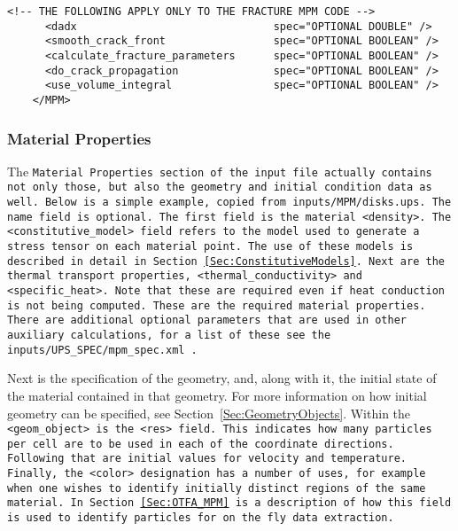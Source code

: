 \begin{Verbatim}[fontsize=\footnotesize]
      <!-- THE FOLLOWING APPLY ONLY TO THE FRACTURE MPM CODE -->
      <dadx                               spec="OPTIONAL DOUBLE" />
      <smooth_crack_front                 spec="OPTIONAL BOOLEAN" />
      <calculate_fracture_parameters      spec="OPTIONAL BOOLEAN" />
      <do_crack_propagation               spec="OPTIONAL BOOLEAN" />
      <use_volume_integral                spec="OPTIONAL BOOLEAN" />
    </MPM>
\end{Verbatim}



\subsubsection{Material Properties} \label{Sec:mat_props}

The \tt Material Properties \normalfont section of the input file
actually contains not only those, but also the geometry and initial
condition data as well.  Below is a simple example, copied from
\tt inputs/MPM/disks.ups. \normalfont  The \tt name \normalfont field
is optional.  The first field is the material \tt <density>. \normalfont
The \tt <constitutive\_model> \normalfont field refers
to the model used to generate a stress tensor on each material point.
The use of these models is described in detail in
Section~\ref{Sec:ConstitutiveModels}.  Next are the thermal transport properties,
\tt <thermal\_conductivity> \normalfont and 
\tt <specific\_heat>. \normalfont  Note that these are required even if
heat conduction is not being computed.  These are the required material
properties.  There are additional optional parameters that are used in
other auxiliary calculations, for a list of these
see the \tt inputs/UPS\_SPEC/mpm\_spec.xml \normalfont.

Next is the specification of the geometry, and, along with it, the initial
state of the material contained in that geometry.  For more information on
how initial geometry can be specified, see Section~\ref{Sec:GeometryObjects}.  Within the
\tt <geom\_object> \normalfont is the \tt <res> \normalfont field.  This
indicates how many particles per cell are to be used in each of the 
coordinate directions.  Following that are initial values for velocity and
temperature.  Finally, the \tt <color> \normalfont designation has a number
of uses, for example when one wishes to identify initially distinct regions
of the same material.  In Section~\ref{Sec:OTFA_MPM} is a description of how
this field is used to identify particles for on the fly data extraction.

